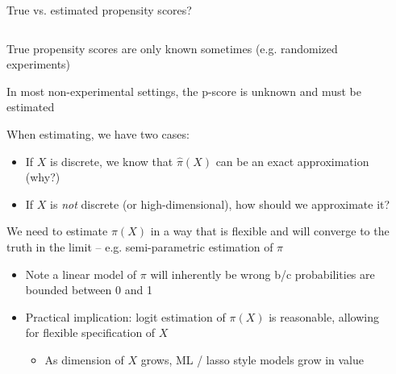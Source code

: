 \documentclass[notes,11pt, aspectratio=169]{beamer}
\newenvironment{wideitemize}{\itemize\addtolength{\itemsep}{10pt}}{\enditemize}
\begin{document}
\begin{frame}{True vs. estimated propensity scores?}
\begin{columns}[T] %
\begin{column}{.9\textwidth}
  \begin{wideitemize}
  \item True propensity scores are only known sometimes (e.g. randomized experiments)
  \item In most non-experimental settings, the p-score is unknown and must be estimated
  \item When estimating, we have two cases:
    \begin{itemize}
    \item If $X$ is discrete, we know that $\hat{\pi}(X)$ can be an exact approximation (why?)
    \item If $X$ is \emph{not} discrete (or high-dimensional), how should we approximate it?
    \end{itemize}
  \item We need to estimate $\pi(X)$ in a way that is flexible and
    will converge to the truth in the limit -- e.g. semi-parametric
    estimation of $\pi$
    \begin{itemize}
    \item Note a linear model of $\pi$ will inherently be wrong b/c probabilities are bounded between 0 and 1
    \item Practical implication: logit estimation of $\pi(X)$ is
      reasonable, allowing for flexible specification of $X$
      \begin{itemize}
      \item As dimension of $X$ grows, ML / lasso style models grow in
        value
      \end{itemize}
    \end{itemize}
    \end{wideitemize}
\end{column}%
\hfill%
\begin{column}{.4\textwidth}

\end{column}%
\end{columns}
\end{frame}
\end{document}
